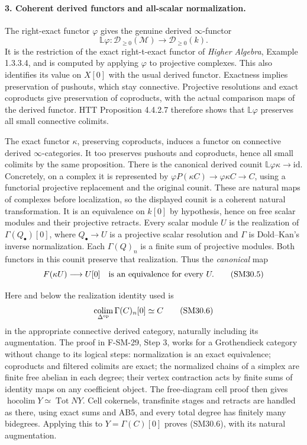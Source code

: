 \paragraph{3. Coherent derived functors and all-scalar normalization.}
The right-exact functor \(\varphi\) gives the genuine derived
\(\infty\)-functor
\[
 \mathbb L\varphi:\mathcal D_{\ge0}(\mathcal M)
                     \longrightarrow\mathcal D_{\ge0}(k).
\]
It is the restriction of the exact right-t-exact functor of
\emph{Higher Algebra}, Example 1.3.3.4, and is computed by
applying \(\varphi\) to projective complexes.  This also
identifies its value on \(X[0]\) with the usual derived functor.
Exactness implies preservation of pushouts, which stay connective.
Projective resolutions and exact coproducts give preservation
of coproducts, with the actual comparison maps of the derived
functor.  HTT Proposition 4.4.2.7 therefore shows that
\(\mathbb L\varphi\) preserves all small connective colimits.

The exact functor \(\kappa\), preserving coproducts, induces
a functor on connective derived \(\infty\)-categories.
It too preserves pushouts and coproducts, hence all small
colimits by the same proposition.  There is the canonical
derived counit \(\mathbb L\varphi\kappa\to\mathrm{id}\).
Concretely, on a complex it is represented by
\(\varphi P(\kappa C)\to\varphi\kappa C\to C\), using
a functorial projective replacement and the original counit.
These are natural maps of complexes before localization, so
the displayed counit is a coherent natural transformation.
It is an equivalence on \(k[0]\) by hypothesis, hence on
free scalar modules and their projective retracts.
Every scalar module \(U\) is the realization of
\(\Gamma(Q_\bullet)[0]\), where \(Q_\bullet\to U\) is a
projective scalar resolution and \(\Gamma\) is Dold--Kan's
inverse normalization.  Each \(\Gamma(Q)_n\) is a finite sum
of projective modules.  Both functors in this counit preserve
that realization.  Thus the \emph{canonical} map
\[
             F(\kappa U)\longrightarrow U[0]
 \quad\hbox{is an equivalence for every }U.                \tag{SM30.5}
\]

Here and below the realization identity used is
\[
 \operatorname*{colim}_{\Delta^{\rm op}}\Gamma(C)_n[0]
                          \simeq C                       \tag{SM30.6}
\]
in the appropriate connective derived category, naturally
including its augmentation.  The proof in F-SM-29, Step 3,
works for a Grothendieck category without change to its logical
steps: normalization is an exact equivalence; coproducts and
filtered colimits are exact; the normalized chains of a simplex
are finite free abelian in each degree; their vertex contraction
acts by finite sums of identity maps on any coefficient object.
The free-diagram cell proof then gives
\(\operatorname{hocolim}Y\simeq\operatorname{Tot}NY\).
Cell cokernels, transfinite stages and retracts are handled as
there, using exact sums and AB5, and every total degree has
finitely many bidegrees.  Applying this to \(Y=\Gamma(C)[0]\)
proves (SM30.6), with its natural augmentation.

